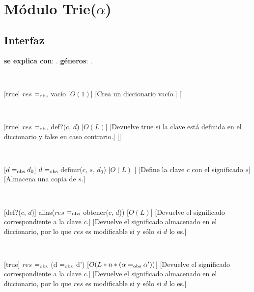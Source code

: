 \section{Módulo Trie($\alpha$)}

\subsection{Interfaz}

\textbf{se explica con}: .
\textbf{géneros}: .

~

%
[true]
{$res$ $=_{\mathrm{obs}}$ vacío}
[$O(1)$]
[Crea un diccionario vacío.]
[]

~

[true]
{$res$ $=_{\mathrm{obs}}$ def?($c$, $d$)}
[$O(L)$]
[Devuelve true si la clave está definida en el diccionario y false en caso contrario.]
[]

~

[$ d =_{\mathrm{obs}} d_0 $]
{$ d =_{\mathrm{obs}}$ definir($c$, $s$, $d_0$)}
[$O(L)$ ]
[Define la clave $c$ con el significado $s$]
[Almacena una copia de $s$.]

~

[def?($c$, $d$)]
{alias($res$ $=_{\mathrm{obs}}$ obtener($c$, $d$))}
[$O(L)$]
[Devuelve el significado correspondiente a la clave $c$.]
[Devuelve el significado almacenado en el diccionario, por lo que $res$ es modificable si y sólo si $d$ lo es.]

~

[true]
{$res$ $=_{\mathrm{obs}}$ (d $=_{\mathrm{obs}}$ d')}
[$O(L*n*(\alpha  =_{\mathrm{obs}} \alpha'))$]
[Devuelve el significado correspondiente a la clave $c$.]
[Devuelve el significado almacenado en el diccionario, por lo que $res$ es modificable si y sólo si $d$ lo es.]
